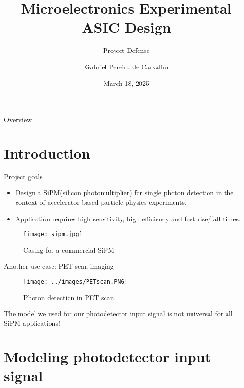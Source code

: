 \documentclass[aspectratio=169,xcolor=dvipsnames]{beamer}
\title{Microelectronics Experimental ASIC Design}
\subtitle{Project Defense}
\author{Gabriel Pereira de Carvalho}
\institute
{
	Ecole polytechnique
}
\date{March 18, 2025} %
\begin{document}
	
	\begin{frame}
		\titlepage
	\end{frame}
	
	\begin{frame}{Overview}
		\tableofcontents
	\end{frame}
	
	\section{Introduction}
	
	\begin{frame}{Project goals}
		\begin{itemize}
			\item Design a SiPM(silicon photomultiplier) for single photon detection in the context of accelerator-based particle physics experiments.
			\item Application requires high sensitivity, high efficiency and fast rise/fall times.
		\end{itemize}
		
		\begin{figure}[h]
			\centering
			\texttt{[image: sipm.jpg]}
			\caption{Casing for a commercial SiPM}
		\end{figure}
	\end{frame}
	
	\begin{frame}{Another use case: PET scan imaging}
		\begin{figure}[h]
			\centering
			\texttt{[image: ../images/PETscan.PNG]}
			\caption{Photon detection in PET scan}
		\end{figure}
		\begin{block}{}
			The model we used for our photodetector input signal is not universal for all SiPM applications!
		\end{block}
	\end{frame}
	
	\section{Modeling photodetector input signal}
	
\end{document}
